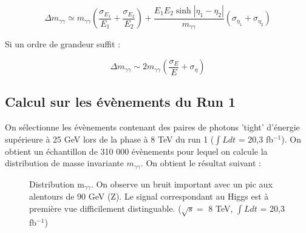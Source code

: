 \documentclass[11pt]{article} %
\begin{document}
\begin{equation}
\Delta m_{\gamma\gamma} \simeq m_{\gamma \gamma}\left( \dfrac{\sigma_{E_1}}{E_1} +  \dfrac{\sigma_{E_2}}{E_2}\right) + \dfrac{E_1E_2 \sinh {|\eta_1 - \eta_2|}}{m_{\gamma \gamma}} \left( \sigma_{\eta_1} + \sigma_{\eta_2} \right)
\end{equation}

Si un ordre de grandeur suffit :

\begin{equation}
\Delta m_{\gamma\gamma} \sim 2m_{\gamma \gamma}\left ( \dfrac{\sigma_E}{E} +  \sigma_{\eta} \right )
\end{equation}

\subsection{Calcul sur les évènements du Run 1}

On sélectionne les évènements contenant des paires de photons 'tight' d'énergie supérieure à 25 GeV lors de la phase à 8 TeV du run 1 ($\int L dt$ = 20,3 fb$^{-1}$).
On obtient un échantillon de 310 000 évènements pour lequel on calcule la distribution de masse invariante $m_{\gamma \gamma}$. On obtient le résultat suivant :

\begin{figure}[H]
\centering
  \caption{Distribution m$_{\gamma \gamma}$. On observe un bruit important avec un pic aux alentours de 90 GeV (Z). Le signal correspondant au Higgs est à première vue difficilement distinguable. ($\sqrt{s} =$ 8 TeV,  $\int L dt$ = 20,3 fb$^{-1}$) }
 \resizebox{.9\linewidth}{!}{}
\end{figure}
\end{document}

